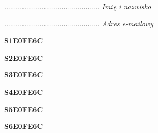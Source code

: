 \begin{turn}{90}\begin{minipage}{\linewidth} \vspace{20mm} ................................................  \textit{Imię i nazwisko}\end{minipage}\end{turn}

\begin{turn}{90}\begin{minipage}{\linewidth} \vspace{20mm} ................................................  \textit{Adres e-mailowy}\end{minipage}\end{turn}

\begin{turn}{90}\huge \begin{minipage}{\linewidth} \vspace{10mm}\textbf{S1E0FE6C}\end{minipage}\end{turn}

\begin{turn}{90}\huge \begin{minipage}{\linewidth} \vspace{10mm}\textbf{S2E0FE6C}\end{minipage}\end{turn}

\begin{turn}{90}\huge \begin{minipage}{\linewidth} \vspace{10mm}\textbf{S3E0FE6C}\end{minipage}\end{turn}

\begin{turn}{90}\huge \begin{minipage}{\linewidth} \vspace{10mm}\textbf{S4E0FE6C}\end{minipage}\end{turn}

\begin{turn}{90}\huge \begin{minipage}{\linewidth} \vspace{10mm}\textbf{S5E0FE6C}\end{minipage}\end{turn}

\begin{turn}{90}\huge \begin{minipage}{\linewidth} \vspace{10mm}\textbf{S6E0FE6C}\end{minipage}\end{turn}

